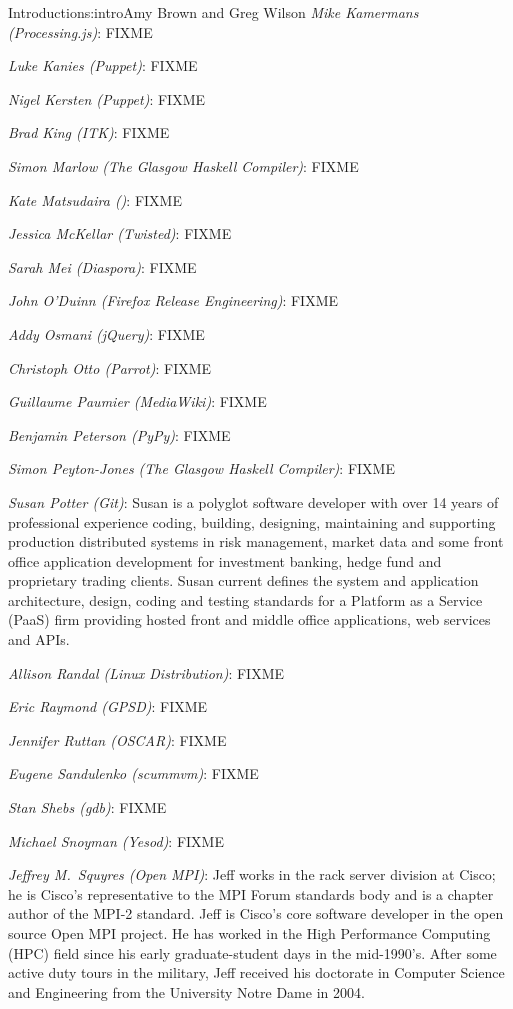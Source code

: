 \begin{aosachapter}{Introduction}{s:intro}{Amy Brown and Greg Wilson}
\emph{Mike Kamermans (Processing.js)}: FIXME

\emph{Luke Kanies (Puppet)}: FIXME

\emph{Nigel Kersten (Puppet)}: FIXME

\emph{Brad King (ITK)}: FIXME

\emph{Simon Marlow (The Glasgow Haskell Compiler)}: FIXME

\emph{Kate Matsudaira ()}: FIXME

\emph{Jessica McKellar (Twisted)}: FIXME

\emph{Sarah Mei (Diaspora)}: FIXME

\emph{John O'Duinn (Firefox Release Engineering)}: FIXME

\emph{Addy Osmani (jQuery)}: FIXME

\emph{Christoph Otto (Parrot)}: FIXME

\emph{Guillaume Paumier (MediaWiki)}: FIXME

\emph{Benjamin Peterson (PyPy)}: FIXME

\emph{Simon Peyton-Jones (The Glasgow Haskell Compiler)}: FIXME

\emph{Susan Potter (Git)}: Susan is a polyglot software developer with
over 14 years of professional experience coding, building, designing,
maintaining and supporting production distributed systems in risk management,
market data and some front office application development for investment
banking, hedge fund and proprietary trading clients. Susan current defines the
system and application architecture, design, coding and testing standards for
a Platform as a Service (PaaS) firm providing hosted front and middle office
applications, web services and APIs.

\emph{Allison Randal (Linux Distribution)}: FIXME

\emph{Eric Raymond (GPSD)}: FIXME

\emph{Jennifer Ruttan (OSCAR)}: FIXME

\emph{Eugene Sandulenko (scummvm)}: FIXME

\emph{Stan Shebs (gdb)}: FIXME

\emph{Michael Snoyman (Yesod)}: FIXME

\emph{Jeffrey M.\ Squyres (Open MPI)}: Jeff works in the rack server
division at Cisco; he is Cisco's representative to the MPI Forum
standards body and is a chapter author of the MPI-2 standard.  Jeff is
Cisco's core software developer in the open source Open MPI project.
He has worked in the High Performance Computing (HPC) field since his
early graduate-student days in the mid-1990's.  After some active duty
tours in the military, Jeff received his doctorate in Computer Science
and Engineering from the University Notre Dame in 2004.


\end{aosachapter}
